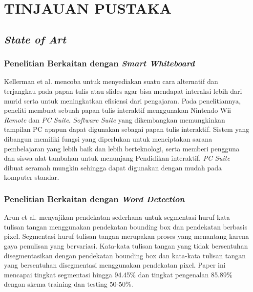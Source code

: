 
\chapter{TINJAUAN PUSTAKA}
\label{chap:tinjauanpustaka}


\section{\textit{State of Art}}
\label{sec:penelitianterdahulu}

\subsection{Penelitian Berkaitan dengan \textit{Smart Whiteboard}}
\label{subsec:penelitianterkaitsmartwhiteboard}
Kellerman et al. \citep*{kellerman2018smart} mencoba untuk menyediakan suatu cara alternatif dan terjangkau pada papan tulis atau slides agar bisa mendapat interaksi lebih dari murid serta untuk meningkatkan efisiensi dari pengajaran. Pada penelitiannya, peneliti membuat sebuah papan tulis interaktif menggunakan Nintendo Wii \textit{Remote} dan \textit{PC Suite}. \textit{Software Suite} yang dikembangkan memungkinkan tampilan PC apapun dapat digunakan sebagai papan tulis interaktif. Sistem yang dibangun memiliki fungsi yang diperlukan untuk menciptakan sarana pembelajaran yang lebih baik dan lebih berteknologi, serta memberi pengguna dan siswa alat tambahan untuk menunjang Pendidikan interaktif. \textit{PC Suite} dibuat seramah mungkin sehingga dapat digunakan dengan mudah pada komputer standar. \par

\subsection{Penelitian Berkaitan dengan \textit{Word Detection}}
\label{subsec:penelitianterkaitworddetection}
Arun et al. \citep*{arun2019handwritten} menyajikan pendekatan sederhana untuk segmentasi huruf kata tulisan tangan menggunakan pendekatan bounding box dan pendekatan berbasis pixel. Segmentasi huruf tulisan tangan merupakan proses yang menantang karena gaya penulisan yang bervariasi. Kata-kata tulisan tangan yang tidak bersentuhan disegmentasikan dengan pendekatan bounding box dan kata-kata tulisan tangan yang bersentuhan disegmentasi menggunakan pendekatan pixel. Paper ini mencapai tingkat segmentasi hingga 94.45\% dan tingkat pengenalan 85.89\% dengan skema training dan testing 50-50\%. \par

